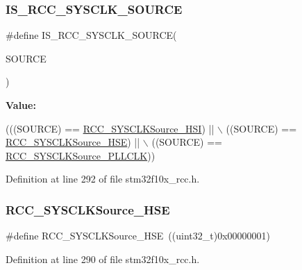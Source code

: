 \subsubsection{\texorpdfstring{I\+S\+\_\+\+R\+C\+C\+\_\+\+S\+Y\+S\+C\+L\+K\+\_\+\+S\+O\+U\+R\+CE}{IS\_RCC\_SYSCLK\_SOURCE}}
{\footnotesize\ttfamily \#define I\+S\+\_\+\+R\+C\+C\+\_\+\+S\+Y\+S\+C\+L\+K\+\_\+\+S\+O\+U\+R\+CE(\begin{DoxyParamCaption}\item[{}]{S\+O\+U\+R\+CE }\end{DoxyParamCaption})}

{\bfseries Value\+:}
\begin{DoxyCode}
(((SOURCE) == \hyperlink{group___system__clock__source_ga0f392254e74dd965c48edd5aad148e20}{RCC\_SYSCLKSource\_HSI}) || \(\backslash\)
                                      ((SOURCE) == \hyperlink{group___system__clock__source_gabeae110e41833842f8620647ea0ce85a}{RCC\_SYSCLKSource\_HSE}) || \(\backslash\)
                                      ((SOURCE) == \hyperlink{group___system__clock__source_ga9301b7a07a7cb8c2c6ed87b619c1c966}{RCC\_SYSCLKSource\_PLLCLK}))
\end{DoxyCode}


Definition at line 292 of file stm32f10x\+\_\+rcc.\+h.

\mbox{\label{group___system__clock__source_gabeae110e41833842f8620647ea0ce85a}} 
\subsubsection{\texorpdfstring{R\+C\+C\+\_\+\+S\+Y\+S\+C\+L\+K\+Source\+\_\+\+H\+SE}{RCC\_SYSCLKSource\_HSE}}
{\footnotesize\ttfamily \#define R\+C\+C\+\_\+\+S\+Y\+S\+C\+L\+K\+Source\+\_\+\+H\+SE~((uint32\+\_\+t)0x00000001)}



Definition at line 290 of file stm32f10x\+\_\+rcc.\+h.

\mbox{\label{group___system__clock__source_ga0f392254e74dd965c48edd5aad148e20}} 
